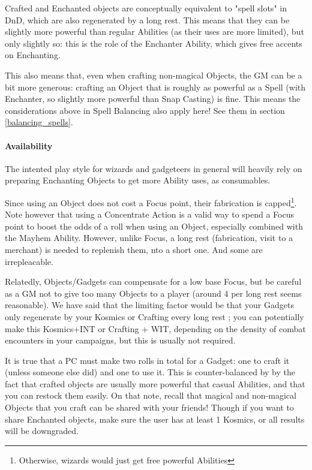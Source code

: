 \label{balancing_crafting}

Crafted and Enchanted objects are conceptually equivalent to "spell slots" in DnD, which are also regenerated by a long rest. This means that they can be slightly more powerful than regular Abilities (as their uses are more limited), but only slightly so: this is the role of the Enchanter Ability, which gives free accents on Enchanting.

This also means that, even when crafting non-magical Objects, the GM can be a bit more generous: crafting an Object that is roughly as powerful as a Spell (with Enchanter, so slightly more powerful than Snap Casting) is fine. This means the considerations above in Spell Balancing also apply here! See them in section \ref{balancing_spells}.


\paragraph{Availability}

The intented play style for wizards and gadgeteers in general will heavily rely on preparing Enchanting Objects to get more Ability uses, as consumables.

Since using an Object does not cost a Focus point, their fabrication is capped\footnote{Otherwise, wizards would just get free powerful Abilities}. Note however that using a Concentrate Action is a valid way to spend a Focus point to boost the odds of a roll when using an Object, especially combined with the Mayhem Ability. However, unlike Focus, a long rest (fabrication, visit to a merchant) is needed to replenish them, nto a short one. And some are irrepleacable.

Relatedly, Objects/Gadgets can compensate for a low base Focus, but be careful as a GM not to give too many Objects to a player (around 4 per long rest seems reasonable). We have said that the limiting factor would be that your Gadgets only regenerate by your Kosmics or Crafting every long rest ; you can potentially make this Kosmics+INT or Crafting + WIT, depending on the density of combat encounters in your campaigns, but this is usually not required.

It is true that a PC must make two rolls in total for a Gadget: one to craft it (unless someone else did) and one to use it. This is counter-balanced by by the fact that crafted objects are usually more powerful that casual Abilities, and that you can restock them easily. On that note, recall that magical and non-magical Objects that you craft can be shared with your friends! Though if you want to share Enchanted objects, make sure the user has at least 1 Kosmics, or all results will be downgraded.


